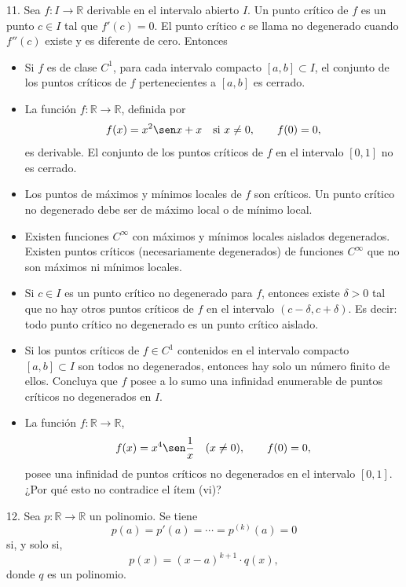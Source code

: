 \documentclass[12pt,oneside]{book}
\begin{document}
11. Sea \( f: I \to \mathbb{R} \) derivable en el intervalo abierto \( I \). Un punto crítico de \( f \) es un punto \( c \in I \) tal que \( f'(c) = 0 \). El punto crítico \( c \) se llama no degenerado cuando \( f''(c) \) existe y es diferente de cero. Entonces
\begin{itemize}
    \item[i)] Si \( f \) es de clase \( C^1 \), para cada intervalo compacto \( [a, b] \subset I \), el conjunto de los puntos críticos de \( f \) pertenecientes a \( [a, b] \) es cerrado.

    \item[ii)] La función \( f: \mathbb{R} \to \mathbb{R} \), definida por
\[
f(x) = x^2 \sen x + x \quad \text{si } x \neq 0, \qquad f(0) = 0,
\]
es derivable. El conjunto de los puntos críticos de \( f \) en el intervalo \( [0, 1] \) no es cerrado.

    \item[iii)] Los puntos de máximos y mínimos locales de \( f \) son críticos. Un punto crítico no degenerado debe ser de máximo local o de mínimo local.

    \item[iv)] Existen funciones \( C^\infty \) con máximos y mínimos locales aislados degenerados. Existen puntos críticos (necesariamente degenerados) de funciones \( C^\infty \) que no son máximos ni mínimos locales.

    \item[v)] Si \( c \in I \) es un punto crítico no degenerado para \( f \), entonces existe \( \delta > 0 \) tal que no hay otros puntos críticos de \( f \) en el intervalo \( (c - \delta, c + \delta) \). Es decir: todo punto crítico no degenerado es un punto crítico aislado.

    \item[vi)] Si los puntos críticos de \( f \in C^1 \) contenidos en el intervalo compacto \( [a, b] \subset I \) son todos no degenerados, entonces hay solo un número finito de ellos. Concluya que \( f \) posee a lo sumo una infinidad enumerable de puntos críticos no degenerados en \( I \).

    \item[vii)] La función \( f: \mathbb{R} \to \mathbb{R} \),
\[
f(x) = x^4 \sen \frac{1}{x} \quad (x \neq 0), \qquad f(0) = 0,
\]
posee una infinidad de puntos críticos no degenerados en el intervalo \( [0, 1] \). ¿Por qué esto no contradice el ítem (vi)?
\end{itemize}

12. Sea \( p: \mathbb{R} \to \mathbb{R} \) un polinomio. Se tiene
\[
p(a) = p'(a) = \cdots = p^{(k)}(a) = 0
\]
si, y solo si,
\[
p(x) = (x - a)^{k+1} \cdot q(x),
\]
donde \( q \) es un polinomio.
\end{document}
